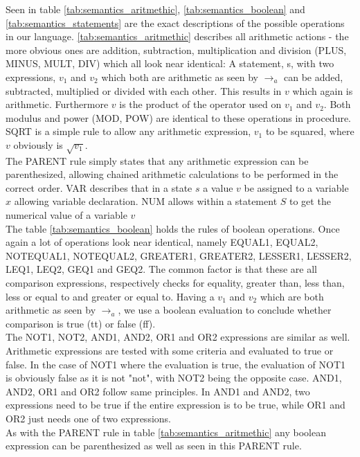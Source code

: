 Seen in table \ref{tab:semantics_aritmethic}, \ref{tab:semantics_boolean} and \ref{tab:semantics_statements} are the exact descriptions of the possible operations in our language. \ref{tab:semantics_aritmethic} describes all arithmetic actions - the more obvious ones are addition, subtraction, multiplication and division (PLUS, MINUS, MULT, DIV) which all look near identical: A statement, s, with two expressions, $v_{1}$ and $v_{2}$ which both are arithmetic as seen by $\rightarrow_{a}$ can be added, subtracted, multiplied or divided with each other. This results in $v$ which again is arithmetic. Furthermore $v$ is the product of the operator used on $v_{1}$ and $v_{2}$. Both modulus and power (MOD, POW) are identical to these operations in procedure. \\
SQRT is a simple rule to allow any arithmetic expression, $v_{1}$ to be squared, where $v$ obviously is $\sqrt{v_{1}}$. \\
The PARENT rule simply states that any arithmetic expression can be parenthesized, allowing chained arithmetic calculations to be performed in the correct order. VAR describes that in a state $s$ a value $v$ be assigned to a variable $x$ allowing variable declaration. NUM allows within a statement $S$ to get the numerical value of a variable $v$ \\

The table \ref{tab:semantics_boolean} holds the rules of boolean operations. Once again a lot of operations look near identical, namely EQUAL1, EQUAL2, NOTEQUAL1, NOTEQUAL2, GREATER1, GREATER2, LESSER1, LESSER2, LEQ1, LEQ2, GEQ1 and GEQ2. The common factor is that these are all comparison expressions, respectively checks for equality, greater than, less than, less or equal to and greater or equal to. Having a $v_{1}$ and $v_{2}$ which are both arithmetic as seen by $\rightarrow_{a}$, we use a boolean evaluation to conclude whether comparison is true (tt) or false (ff). \\
The NOT1, NOT2, AND1, AND2, OR1 and OR2 expressions are similar as well. Arithmetic expressions are tested with some criteria and evaluated to true or false. In the case of NOT1 where the evaluation is true, the evaluation of NOT1 is obviously false as it is not "not", with NOT2 being the opposite case. AND1, AND2, OR1 and OR2 follow same principles. In AND1 and AND2, two expressions need to be true if the entire expression is to be true, while OR1 and OR2 just needs one of two expressions. \\
As with the PARENT rule in table \ref{tab:semantics_aritmethic} any boolean expression can be parenthesized as well as seen in this PARENT rule. \\ 

